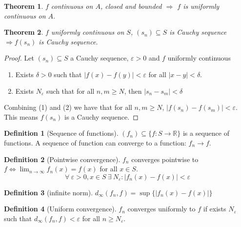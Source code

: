 \documentclass{article}
\newcommand{\DS}{\displaystyle}
\newcommand{\abs}[1]{\left|#1\right|}
\newcommand{\Ar}{\Rightarrow}
\newcommand{\f}[3]{#1 : #2 \rightarrow #3}
\newcommand{\limn}{\lim_{n \to \infty}}
\theoremstyle{definition}
\newtheorem{definition}{Definition}[section]
\theoremstyle{definition}
\theoremstyle{plain}
\newtheorem{theorem}{Theorem}[section]
\theoremstyle{plain}
\theoremstyle{plain}
\theoremstyle{plain}
\theoremstyle{definition}
\theoremstyle{remark}
\theoremstyle{remark}
\theoremstyle{remark}
\theoremstyle{remark}
\newcommand{\R}{\mathbb{R}}
\newcommand{\ForAll}{\ \forall \ }
\newcommand{\Exists}{\ \exists \ }
\newcommand{\E}{\varepsilon}
\begin{document}
\begin{theorem}
  $f$ continuous on $A$, closed and bounded $\Ar$ $f$ is uniformly continuous on $A$.
\end{theorem}


\begin{theorem}
  $f$ uniformly continuous on $S$, $(s_n) \subseteq S$ is Cauchy sequence $\Ar f(s_n)$ is Cauchy sequence.
\end{theorem}

\begin{proof}
  Let $(s_n) \subseteq S$ a Cauchy sequence, $\E > 0$ and $f$ uniformly continuous
  \begin{enumerate}
  \item Exists $\delta > 0$ such that $\abs{f(x)-f(y)} < \E$ for all $\abs{x-y} < \delta$.
  \item Exists $N_\E$ such that for all $n,m \geq N$, then $\abs{s_n - s_m} < \delta$
  \end{enumerate}
  Combining (1) and (2) we have that for all $n,m \geq N$, $\abs{f(s_n)-f(s_m)} < \E$. This means $f(s_n)$ is a Cauchy sequence.
\end{proof}



\begin{definition}[Sequence of functions]
  $(f_n) \subseteq \{ \f{f}{S}{\R} \}$ is a sequence of functions. A sequence of function can converge to a function: $f_n \to f$.
\end{definition}



\begin{definition}[Pointwise convergence]
  $f_n$ converges pointwise to $f \iff \DS \limn{f_n(x)} = f(x)$ for all $x \in S$.
  \[
  \ForAll \E > 0, x \in S \Exists N_\E : \abs{f_n(x) - f(x)} < \E
  \]
\end{definition}



\begin{definition}[infinite norm]
  $d_\infty(f_n,f) = \sup \{ \abs{f_n(x) - f(x)} \}$
\end{definition}


\begin{definition}[Uniform convergence]
  $f_n$ converges uniformly to $f$ if exists $N_\E$ such that $d_\infty(f_n,f) < \E$ for all $n \geq N_\E$.
\end{definition}
\end{document}
